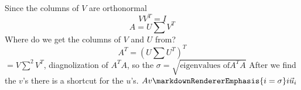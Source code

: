\markdownRendererInterblockSeparator
{}Since the columns of $V$ are orthonormal\markdownRendererEllipsis{}\markdownRendererInterblockSeparator
{}$$VV^T=I$$\markdownRendererInterblockSeparator
{}$$A = U\sum V^T$$\markdownRendererInterblockSeparator
{}Where do we get the columns of $V$ and $U$ from?\markdownRendererInterblockSeparator
{}$$A^T = (U\sum U^T)^T$$\markdownRendererInterblockSeparator
{}$=V\sum^2 V^T$, diagnolization of $A^TA$, so the $\sigma=\sqrt{\text{eigenvalues of}A^TA}$\markdownRendererInterblockSeparator
{}After we find the $v$'s there is a shortcut for the $u$'s.\markdownRendererInterblockSeparator
{}$Av\markdownRendererEmphasis{i = \sigma}i\vec{u}_i$\relax